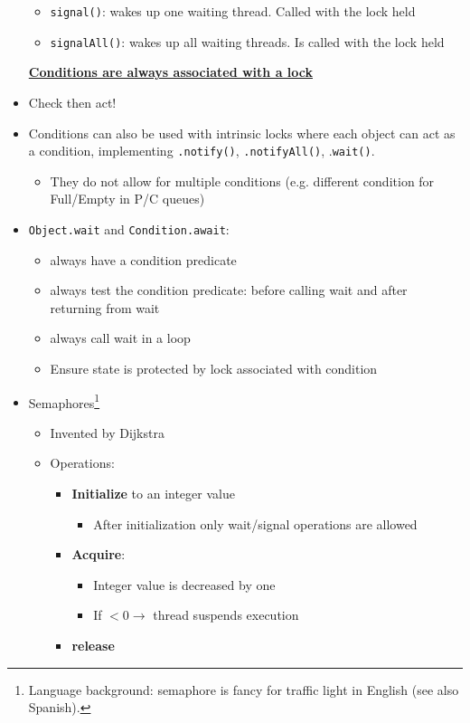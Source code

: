 \documentclass[a4paper]{article}
\newcommand{\inline}[1]{\lstinline!#1!}%
\begin{document}
\begin{itemize}
\begin{itemize}
\item \inline{signal()}: wakes up one waiting thread. Called with the lock held
\item \inline{signalAll()}: wakes up all waiting threads. Is called with the lock held
\end{itemize}
\textbf{\underline{Conditions are always associated with a lock}}
\item Check then act! 
\item Conditions can also be used with intrinsic locks where each object can act as a condition, implementing \inline{.notify()}, \inline{.notifyAll()}, .\inline{wait()}. 
\begin{itemize}
\item They do not allow for multiple conditions (e.g. different condition for Full/Empty in P/C queues)
\end{itemize}
\item \inline{Object.wait} and \inline{Condition.await}: 
\begin{itemize}
\item always have a condition predicate
\item always test the condition predicate: before calling wait and after returning from wait 
\item always call wait in a loop
\item Ensure state is protected by lock associated with condition
\end{itemize}
\item Semaphores\footnote{Language background: semaphore is fancy for traffic light in English (see also Spanish).} 
\begin{itemize}
\item Invented by Dijkstra
\item Operations:
\begin{itemize}
\item \textbf{Initialize} to an integer value
\begin{itemize}
\item After initialization only wait/signal operations are allowed
\end{itemize}
\item \textbf{Acquire}:
\begin{itemize}
\item Integer value is decreased by one
\item If $<0\to$ thread suspends execution
\end{itemize}
\item \textbf{release}
\begin{itemize}

\end{itemize}
\end{itemize}
\end{itemize}
\end{itemize}
\end{document}
